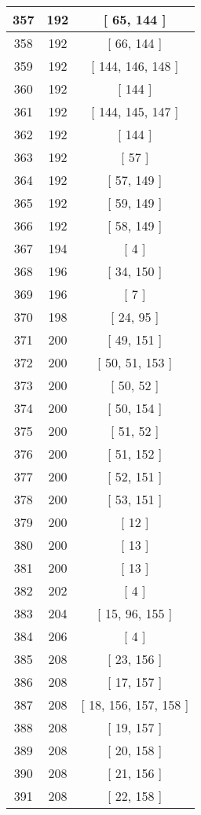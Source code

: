 \begin{center}
\begin{longtable}[H]{|| c c c ||}
\hline
357 & 192 & [ 65, 144 ] \\ 
\hline
358 & 192 & [ 66, 144 ] \\ 
\hline
359 & 192 & [ 144, 146, 148 ] \\ 
\hline
360 & 192 & [ 144 ] \\ 
\hline
361 & 192 & [ 144, 145, 147 ] \\ 
\hline
362 & 192 & [ 144 ] \\ 
\hline
363 & 192 & [ 57 ] \\ 
\hline
364 & 192 & [ 57, 149 ] \\ 
\hline
365 & 192 & [ 59, 149 ] \\ 
\hline
366 & 192 & [ 58, 149 ] \\ 
\hline
367 & 194 & [ 4 ] \\ 
\hline
368 & 196 & [ 34, 150 ] \\ 
\hline
369 & 196 & [ 7 ] \\ 
\hline
370 & 198 & [ 24, 95 ] \\ 
\hline
371 & 200 & [ 49, 151 ] \\ 
\hline
372 & 200 & [ 50, 51, 153 ] \\ 
\hline
373 & 200 & [ 50, 52 ] \\ 
\hline
374 & 200 & [ 50, 154 ] \\ 
\hline
375 & 200 & [ 51, 52 ] \\ 
\hline
376 & 200 & [ 51, 152 ] \\ 
\hline
377 & 200 & [ 52, 151 ] \\ 
\hline
378 & 200 & [ 53, 151 ] \\ 
\hline
379 & 200 & [ 12 ] \\ 
\hline
380 & 200 & [ 13 ] \\ 
\hline
381 & 200 & [ 13 ] \\ 
\hline
382 & 202 & [ 4 ] \\ 
\hline
383 & 204 & [ 15, 96, 155 ] \\ 
\hline
384 & 206 & [ 4 ] \\ 
\hline
385 & 208 & [ 23, 156 ] \\ 
\hline
386 & 208 & [ 17, 157 ] \\ 
\hline
387 & 208 & [ 18, 156, 157, 158 ] \\ 
\hline
388 & 208 & [ 19, 157 ] \\ 
\hline
389 & 208 & [ 20, 158 ] \\ 
\hline
390 & 208 & [ 21, 156 ] \\ 
\hline
391 & 208 & [ 22, 158 ] \\ 

\end{longtable}
\end{center}
